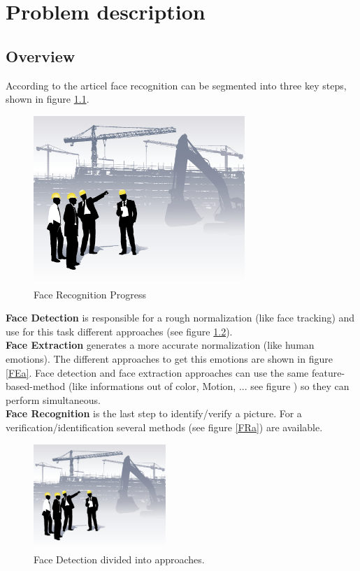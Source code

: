 \documentclass[Bachelorarbeit.tex]{subfiles}
\begin{document}
\chapter{Problem description}\label{ProblemDescription}
\section{Overview}
According to the articel \cite{FRLiteratureSurvey} face recognition can be segmented into three key steps, shown in figure \ref{FRP}.

\begin{figure}[hbtp]
\centering
\includegraphics[width=8cm]{./pictures/UnderConstruction}
\caption{Face Recognition Progress \label{FRP}}
\end{figure}

\textbf{Face Detection} is responsible for a rough normalization (like face tracking) and use for this task different approaches (see figure \ref{FDa}).\\
\textbf{Face Extraction} generates a more accurate normalization (like human emotions). The different approaches to get this emotions are shown in figure \ref{FEa}. Face detection and face extraction approaches can use the same feature-based-method (like informations out of color, Motion, ... see figure \label{FDaSurvey}) so they can perform simultaneous. \\
\textbf{Face Recognition} is the last step to identify/verify a picture. For a verification/identification several methods (see figure \ref{FRa}) are available.


\begin{figure}[!h] %
\centering
\includegraphics[width=5cm]{./pictures/UnderConstruction}
\caption{Face Detection divided into approaches. \label{FDa}}
\end{figure}
\end{document}
